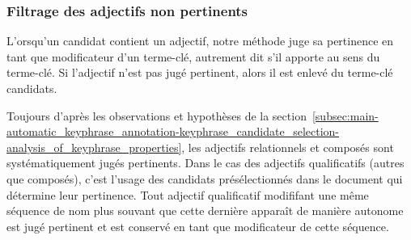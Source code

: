       \subsubsection{Filtrage des adjectifs non pertinents}
      \label{subsubsec:main-automatic_keyphrase_annotation-keyphrase_candidate_selection-modifiers_filtering-adjective_filtering}
        L'orsqu'un candidat contient un adjectif, notre méthode juge sa
        pertinence en tant que modificateur d'un terme-clé, autrement dit s'il
        apporte au sens du terme-clé. Si l'adjectif n'est pas jugé pertinent,
        alors il est enlevé du terme-clé candidats.

        Toujours d'après les observations et hypothèses de la
        section~\ref{subsec:main-automatic_keyphrase_annotation-keyphrase_candidate_selection-analysis_of_keyphrase_properties},
        les adjectifs relationnels et composés sont systématiquement jugés
        pertinents. Dans le cas des adjectifs qualificatifs (autres que
        composés), c'est l'usage des candidats présélectionnés dans le document
        qui détermine leur pertinence. Tout adjectif qualificatif modififant une
        même séquence de nom plus souvant que cette dernière apparaît de manière
        autonome est jugé pertinent et est conservé en tant que modificateur de
        cette séquence.

